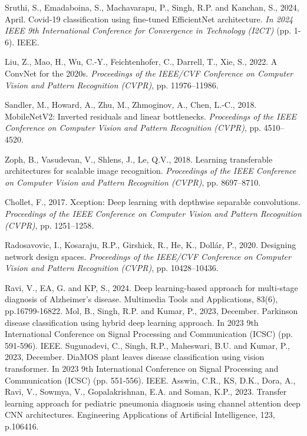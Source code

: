 \documentclass[conference]{IEEEtran}
\begin{document}
\begin{thebibliography}{}
 Sruthi, S., Emadaboina, S., Machavarapu, P., Singh, R.P. and Kanchan, S., 2024, April. Covid-19 classification using fine-tuned EfficientNet architecture. \textit{In 2024 IEEE 9th International Conference for Convergence in Technology (I2CT)} (pp. 1-6). IEEE.


Liu, Z., Mao, H., Wu, C.-Y., Feichtenhofer, C., Darrell, T., Xie, S., 2022. A ConvNet for the 2020s. \textit{Proceedings of the IEEE/CVF Conference on Computer Vision and Pattern Recognition (CVPR)}, pp. 11976--11986.

Sandler, M., Howard, A., Zhu, M., Zhmoginov, A., Chen, L.-C., 2018. MobileNetV2: Inverted residuals and linear bottlenecks. \textit{Proceedings of the IEEE Conference on Computer Vision and Pattern Recognition (CVPR)}, pp. 4510--4520.

Zoph, B., Vasudevan, V., Shlens, J., Le, Q.V., 2018. Learning transferable architectures for scalable image recognition. \textit{Proceedings of the IEEE Conference on Computer Vision and Pattern Recognition (CVPR)}, pp. 8697--8710.

Chollet, F., 2017. Xception: Deep learning with depthwise separable convolutions. \textit{Proceedings of the IEEE Conference on Computer Vision and Pattern Recognition (CVPR)}, pp. 1251--1258.

Radosavovic, I., Kosaraju, R.P., Girshick, R., He, K., Dollár, P., 2020. Designing network design spaces. \textit{Proceedings of the IEEE/CVF Conference on Computer Vision and Pattern Recognition (CVPR)}, pp. 10428--10436.

Ravi, V., EA, G. and KP, S., 2024. Deep learning-based approach for multi-stage diagnosis of Alzheimer’s disease. Multimedia Tools and Applications, 83(6), pp.16799-16822.
Mol, B., Singh, R.P. and Kumar, P., 2023, December. Parkinson disease classification using hybrid deep learning approach. In 2023 9th International Conference on Signal Processing and Communication (ICSC) (pp. 591-596). IEEE.
Sugunadevi, C., Singh, R.P., Maheswari, B.U. and Kumar, P., 2023, December. DiaMOS plant leaves disease classification using vision transformer. In 2023 9th International Conference on Signal Processing and Communication (ICSC) (pp. 551-556). IEEE.
Asswin, C.R., KS, D.K., Dora, A., Ravi, V., Sowmya, V., Gopalakrishnan, E.A. and Soman, K.P., 2023. Transfer learning approach for pediatric pneumonia diagnosis using channel attention deep CNN architectures. Engineering Applications of Artificial Intelligence, 123, p.106416.
\end{thebibliography}
\end{document}
